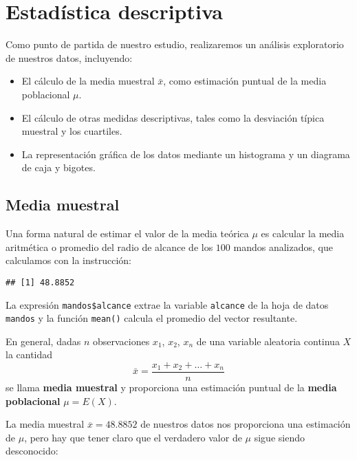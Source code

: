 \documentclass[
  degree=mecinf,
  title=normal,
  toc=normal,
  bib=normal]{mnye}
\newenvironment{Shaded}{\begin{snugshade}}{\end{snugshade}}
\newcommand{\FunctionTok}[1]{\textcolor[rgb]{0.00,0.00,0.00}{#1}}
\newcommand{\NormalTok}[1]{#1}
\newcommand{\SpecialCharTok}[1]{\textcolor[rgb]{0.00,0.00,0.00}{#1}}
\begin{document}
\hypertarget{descriptive}{%
\section{Estadística descriptiva}\label{descriptive}}

Como punto de partida de nuestro estudio, realizaremos un análisis exploratorio de nuestros datos, incluyendo:

\begin{itemize}
\item
  El cálculo de la media muestral \(\bar x\), como estimación puntual de la media poblacional \(\mu\).
\item
  El cálculo de otras medidas descriptivas, tales como la desviación típica muestral y los cuartiles.
\item
  La representación gráfica de los datos mediante un histograma y un diagrama de caja y bigotes.
\end{itemize}

\hypertarget{mean}{%
\subsection{Media muestral}\label{mean}}

Una forma natural de estimar el valor de la media teórica \(\mu\) es calcular la media aritmética o promedio del radio de alcance de los \(100\) mandos analizados, que calculamos con la instrucción:

\begin{Shaded}
\end{Shaded}

\begin{verbatim}
## [1] 48.8852
\end{verbatim}

La expresión \texttt{mandos\$alcance} extrae la variable \texttt{alcance} de la hoja de datos \texttt{mandos} y la función \texttt{mean()} calcula el promedio del vector resultante.

En general, dadas \(n\) observaciones \(x_1\), \(x_2\), \(x_n\) de una variable aleatoria continua \(X\) la cantidad
\[
    \bar{x} = \frac{x_1 + x_2 + \dots + x_n}{n}
\]
se llama \textbf{media muestral} y proporciona una estimación puntual de la \textbf{media poblacional} \(\mu = E(X)\).

La media muestral \(\overline{x} = 48.8852\) de nuestros datos nos proporciona una estimación de \(\mu\), pero hay que tener claro que el verdadero valor de \(\mu\) sigue siendo desconocido:
\end{document}
